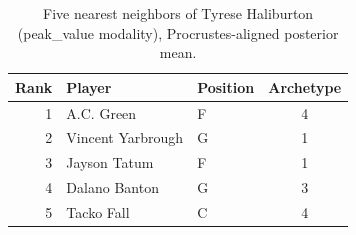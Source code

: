 \begin{table}[htbp]
  \centering\small
  \begin{tabular}{rllc}
    \toprule
    Rank & Player & Position & Archetype \\
    \midrule
    1 & A.C. Green & F & 4 \\
    2 & Vincent Yarbrough & G & 1 \\
    3 & Jayson Tatum & F & 1 \\
    4 & Dalano Banton & G & 3 \\
    5 & Tacko Fall & C & 4 \\
    \bottomrule
  \end{tabular}
  \caption{Five nearest neighbors of Tyrese Haliburton (peak_value modality), Procrustes-aligned posterior mean.}
  \label{tab:Tyrese_Haliburton_neighbors_peak_value}
\end{table}

